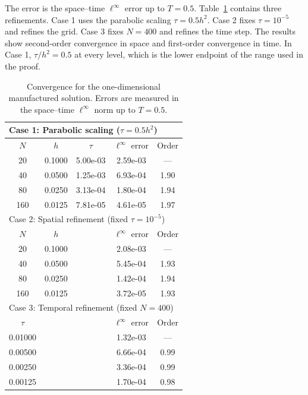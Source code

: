 \documentclass[11pt,reqno]{amsart}
\theoremstyle{plain}
\theoremstyle{definition}
\numberwithin{equation}{section}
\begin{document}
The error is the space--time $\ell^\infty$ error up to
$T=0.5$. Table~\ref{tab:conv-1d} contains three refinements. Case 1 uses the
parabolic scaling $\tau=0.5h^2$. Case 2 fixes $\tau=10^{-5}$ and refines the
grid. Case 3 fixes $N=400$ and refines the time step. The results show
second-order convergence in space and first-order convergence in time. In
Case 1, $\tau/h^2=0.5$ at every level, which is the lower endpoint of the range
used in the proof.

\begin{table}[htbp]
\centering
\caption{Convergence for the one-dimensional manufactured
solution. Errors are measured in the space--time $\ell^\infty$ norm up to
$T=0.5$.}
\label{tab:conv-1d}
\begin{tabular}{c c c c c}
\toprule
\multicolumn{5}{l}{Case 1: Parabolic scaling ($\tau = 0.5 h^2$)} \\
\midrule
$N$ & $h$ & $\tau$ & $\ell^\infty$ error & Order \\
\midrule
20  & 0.1000 & 5.00e-03 & 2.59e-03 & ---  \\
40  & 0.0500 & 1.25e-03 & 6.93e-04 & 1.90 \\
80  & 0.0250 & 3.13e-04 & 1.80e-04 & 1.94 \\
160 & 0.0125 & 7.81e-05 & 4.61e-05 & 1.97 \\
\midrule
\multicolumn{5}{l}{Case 2: Spatial refinement (fixed $\tau = 10^{-5}$)} \\
\midrule
$N$ & $h$ & & $\ell^\infty$ error & Order \\
\midrule
20  & 0.1000 & & 2.08e-03 & ---  \\
40  & 0.0500 & & 5.45e-04 & 1.93 \\
80  & 0.0250 & & 1.42e-04 & 1.94 \\
160 & 0.0125 & & 3.72e-05 & 1.93 \\
\midrule
\multicolumn{5}{l}{Case 3: Temporal refinement (fixed $N=400$)} \\
\midrule
$\tau$ & & & $\ell^\infty$ error & Order \\
\midrule
0.01000 & & & 1.32e-03 & ---  \\
0.00500 & & & 6.66e-04 & 0.99 \\
0.00250 & & & 3.36e-04 & 0.99 \\
0.00125 & & & 1.70e-04 & 0.98 \\
\bottomrule
\end{tabular}
\end{table}

% 
\end{document}
